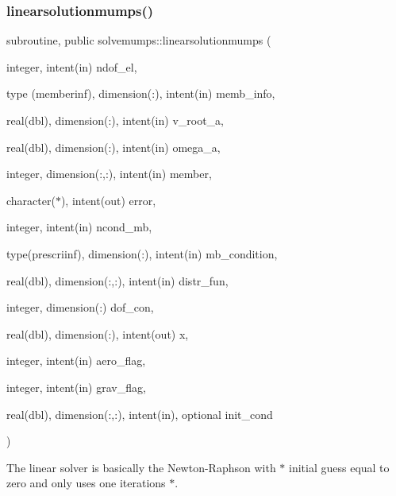 \subsubsection{\texorpdfstring{linearsolutionmumps()}{linearsolutionmumps()}}
{\footnotesize\ttfamily subroutine, public solvemumps\+::linearsolutionmumps (\begin{DoxyParamCaption}\item[{integer, intent(in)}]{ndof\+\_\+el,  }\item[{type (memberinf), dimension(\+:), intent(in)}]{memb\+\_\+info,  }\item[{real(dbl), dimension(\+:), intent(in)}]{v\+\_\+root\+\_\+a,  }\item[{real(dbl), dimension(\+:), intent(in)}]{omega\+\_\+a,  }\item[{integer, dimension(\+:,\+:), intent(in)}]{member,  }\item[{character($\ast$), intent(out)}]{error,  }\item[{integer, intent(in)}]{ncond\+\_\+mb,  }\item[{type(prescriinf), dimension(\+:), intent(in)}]{mb\+\_\+condition,  }\item[{real(dbl), dimension(\+:,\+:), intent(in)}]{distr\+\_\+fun,  }\item[{integer, dimension(\+:)}]{dof\+\_\+con,  }\item[{real(dbl), dimension(\+:), intent(out)}]{x,  }\item[{integer, intent(in)}]{aero\+\_\+flag,  }\item[{integer, intent(in)}]{grav\+\_\+flag,  }\item[{real(dbl), dimension(\+:,\+:), intent(in), optional}]{init\+\_\+cond }\end{DoxyParamCaption})}



The linear solver is basically the Newton-\/\+Raphson with $\ast$ initial guess equal to zero and only uses one iterations $\ast$. 


